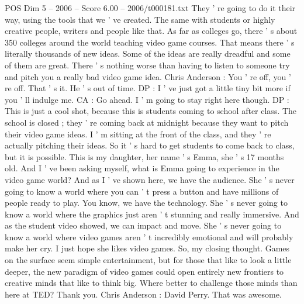 \begin{textsample}{POS Dim 5 – 2006 – Score 6.00 – 2006/t000181.txt}
They ' re going to do it their way, using the tools that we ' ve created.
The same with students or highly creative people, writers and people like that.
As far as colleges go, there ' s about 350 colleges around the world teaching video game courses.
That means there ' s literally thousands of new ideas.
Some of the ideas are really dreadful and some of them are great.
There ' s nothing worse than having to listen to someone try and pitch you a really bad video game idea.
Chris Anderson : You ' re off, you ' re off.
That ' s it.
He ' s out of time.
DP : I ' ve just got a little tiny bit more if you ' ll indulge me.
CA : Go ahead.
I ' m going to stay right here though.
DP : This is just a cool shot, because this is students coming to school after class.
The school is closed ; they ' re coming back at midnight because they want to pitch their video game ideas.
I ' m sitting at the front of the class, and they ' re actually pitching their ideas.
So it ' s hard to get students to come back to class, but it is possible.
This is my daughter, her name ' s Emma, she ' s 17 months old.
And I ' ve been asking myself, what is Emma going to experience in the video game world?
And as I ' ve shown here, we have the audience.
She ' s never going to know a world where you can ' t press a button and have millions of people ready to play.
You know, we have the technology.
She ' s never going to know a world where the graphics just aren ' t stunning and really immersive.
And as the student video showed, we can impact and move.
She ' s never going to know a world where video games aren ' t incredibly emotional and will probably make her cry.
I just hope she likes video games.
So, my closing thought.
Games on the surface seem simple entertainment, but for those that like to look a little deeper, the new paradigm of video games could open entirely new frontiers to creative minds that like to think big.
Where better to challenge those minds than here at TED?
Thank you.
Chris Anderson : David Perry.
That was awesome.

\end{textsample}
